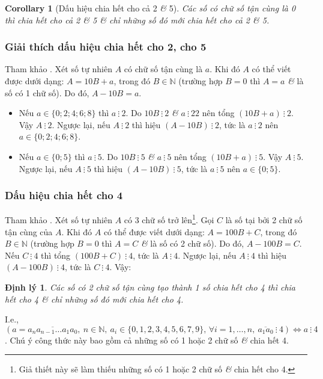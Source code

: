 \documentclass{article}
\numberwithin{equation}{section}
\newtheorem{corollary}{Corollary}[section]
\newtheorem{dinhly}{Định lý}[section]
\begin{document}
\begin{corollary}[Dấu hiệu chia hết cho cả 2 \textit{\&} 5]
	Các số có chữ số tận cùng là 0 thì chia hết cho cả 2 \textit{\&} 5 \textit{\&} chỉ những số đó mới chia hết cho cả 2 \textit{\&} 5.
\end{corollary}

\subsubsection{Giải thích dấu hiệu chia hết cho 2, cho 5}
Tham khảo \cite[p. 37]{SGK_Toan_6_Canh_Dieu_tap_1}. Xét số tự nhiên $A$ có chữ số tận cùng là $a$. Khi đó $A$ có thể viết được dưới dạng: $A = 10B + a$, trong đó $B\in\mathbb{N}$ (trường hợp $B = 0$ thì $A = a$ \textit{\&} là số có 1 chữ số). Do đó, $A - 10 B = a$.
\begin{itemize}
	\item Nếu $a\in\{0;2;4;6;8\}$ thì $a\ \vdots\ 2$. Do $10B\ \vdots\ 2$ \textit{\&} $a\ \vdots\ 2 2$ nên tổng $(10B + a)\ \vdots\ 2$. Vậy $A\ \vdots\ 2$. Ngược lại, nếu $A\ \vdots\ 2$ thì hiệu $(A - 10B)\ \vdots\ 2$, tức là $a\ \vdots\ 2$ nên $a\in\{0;2;4;6;8\}$.
	\item Nếu $a\in\{0;5\}$ thì $a\ \vdots\ 5$. Do $10B\ \vdots\ 5$ \textit{\&} $a\ \vdots\ 5$ nên tổng $(10B + a)\ \vdots\ 5$. Vậy $A\ \vdots\ 5$. Ngược lại, nếu $A\ \vdots\ 5$ thì hiệu $(A - 10B)\ \vdots\ 5$, tức là $a\ \vdots\ 5$ nên $a\in\{0;5\}$.
\end{itemize}

\subsubsection{Dấu hiệu chia hết cho 4}
Tham khảo \cite[p. 37]{SGK_Toan_6_Canh_Dieu_tap_1}. Xét số tự nhiên $A$ có 3 chữ số trở lên\footnote{Giả thiết này sẽ làm thiếu những số có 1 hoặc 2 chữ số \textit{\&} chia hết cho 4.}. Gọi $C$ là số tại bởi 2 chữ số tận cùng của $A$. Khi đó $A$ có thể được viết dưới dạng: $A = 100B + C$, trong đó $B\in\mathbb{N}$ (trường hợp $B = 0$ thì $A = C$ \textit{\&} là số có 2 chữ số). Do đó, $A - 100B = C$. Nếu $C\ \vdots\ 4$ thì tổng $(100B + C)\ \vdots\ 4$, tức là $A\ \vdots\ 4$. Ngược lại, nếu $A\ \vdots\ 4$ thì hiệu $(A - 100B)\ \vdots\ 4$, tức là $C\ \vdots\ 4$. Vậy:

\begin{dinhly}
	Các số có 2 chữ số tận cùng tạo thành 1 số chia hết cho 4 thì chia hết cho 4 \textit{\&} chỉ những số đó mới chia hết cho 4.
\end{dinhly}
I.e., $(a = \overline{a_na_{n-1}\ldots a_1a_0},\ n\in\mathbb{N},\ a_i\in\{0,1,2,3,4,5,6,7,9\},\,\forall i = 1,\ldots,n,\ \overline{a_1a_0}\ \vdots\ 4)\Leftrightarrow a\ \vdots\ 4$. Chú ý công thức này bao gồm cả những số có 1 hoặc 2 chữ số \textit{\&} chia hết 4.
\end{document}
